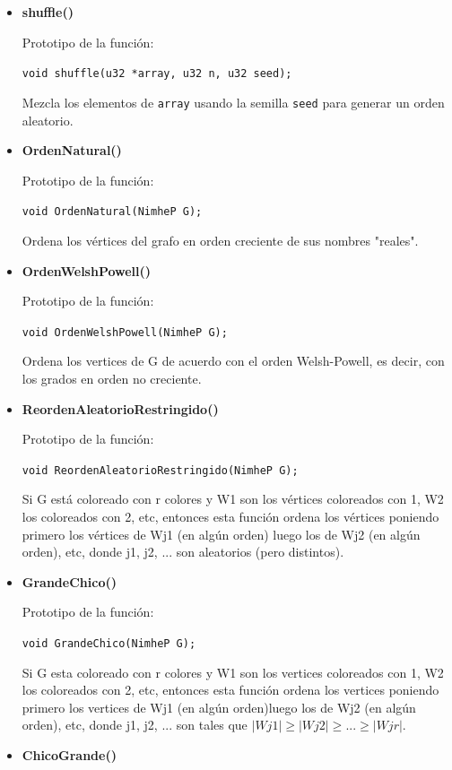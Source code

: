 \documentclass[11pt,a4paper]{article}
\theoremstyle{plain}
\begin{document}
\begin{itemize}
\item{\textbf{{shuffle()}}}

Prototipo de la función:

\texttt{void shuffle(u32 *array, u32 n, u32 seed);}

Mezcla los elementos de \texttt{array} usando la semilla \texttt{seed} para generar un orden aleatorio.

\item{\textbf{{OrdenNatural()}}}

Prototipo de la función:

\texttt{void OrdenNatural(NimheP G);}

Ordena los vértices del grafo en orden creciente de sus nombres "reales".

\item{\textbf{{OrdenWelshPowell()}}}

Prototipo de la función:

\texttt{void OrdenWelshPowell(NimheP G);}

Ordena los vertices de G de acuerdo con el orden Welsh-Powell, es decir, con los grados en orden no creciente.

\item{\textbf{{ReordenAleatorioRestringido()}}}

Prototipo de la función:

\texttt{void ReordenAleatorioRestringido(NimheP G);}

Si G está coloreado con r colores y W1 son los vértices coloreados con 1, W2 los coloreados con 2, etc, entonces esta función ordena los vértices poniendo primero los vértices de Wj1 (en algún orden) luego los de Wj2 (en algún orden), etc, donde j1, j2, ... son aleatorios (pero distintos).

\item{\textbf{{GrandeChico()}}}

Prototipo de la función:

\texttt{void GrandeChico(NimheP G);}

Si G esta coloreado con r colores y W1 son los vertices coloreados con 1, W2 los coloreados con 2,
etc, entonces esta función ordena los vertices poniendo primero los vertices de Wj1 (en algún orden)luego los de Wj2 (en algún orden), etc, donde j1, j2, ... son tales que $|Wj1| \geq |Wj2| \geq  ... \geq |Wjr|$.

\item{\textbf{{ChicoGrande()}}}


\end{itemize}
\end{document}
